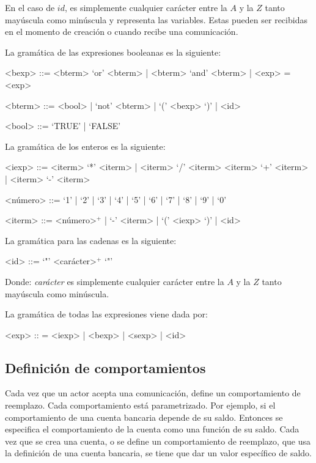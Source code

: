En el caso de $id$, es simplemente cualquier carácter entre la $A$ y la $Z$ tanto mayúscula como minúscula y representa las variables. Estas pueden ser recibidas en el momento de creación o cuando recibe una comunicación.

La gramática de las expresiones booleanas es la siguiente:

\begin{grammar}

<bexp> ::= <bterm> `or' <bterm> | <bterm> `and' <bterm> | <exp> = <exp>
  
<bterm> ::= <bool> | `not' <bterm> | `(' <bexp> `)' | <id>

<bool> ::= `TRUE' | `FALSE'

\end{grammar}
La gramática de los enteros es la siguiente:
\begin{grammar}

<iexp> ::= <iterm> `*' <iterm> | <iterm> `/' <iterm> 
\alt <iterm> `+' <iterm>  | <iterm> `-' <iterm>

<número> ::= `1' | `2' | `3' | `4' | `5' | `6' | `7' | `8' | `9' | `0'

<iterm> ::= <número>$^{+}$ | `-' <iterm> | `(' <iexp> `)' | <id> 

\end{grammar}
La gramática para las cadenas es la siguiente:
\begin{grammar}
 <id> ::= `"' <carácter>$^{+}$ `"'
\end{grammar}
Donde: \textit{carácter} es simplemente cualquier carácter entre la $A$ y la $Z$ tanto mayúscula como minúscula.

La gramática de todas las expresiones viene dada por:

\begin{grammar}
<exp> :: = <iexp> | <bexp> | <sexp> | <id>  
\end{grammar}


\subsection{Definición de comportamientos}\label{actores:beha}
Cada vez que un actor acepta una comunicación, define un comportamiento de reemplazo. Cada comportamiento está parametrizado. Por ejemplo, si el comportamiento de una cuenta bancaria depende de su saldo. Entonces se especifica el comportamiento de la cuenta como una función de su saldo. Cada vez que se crea una cuenta, o se define un comportamiento de reemplazo, que usa la definición de una cuenta bancaria, se tiene que dar un valor específico de saldo.

